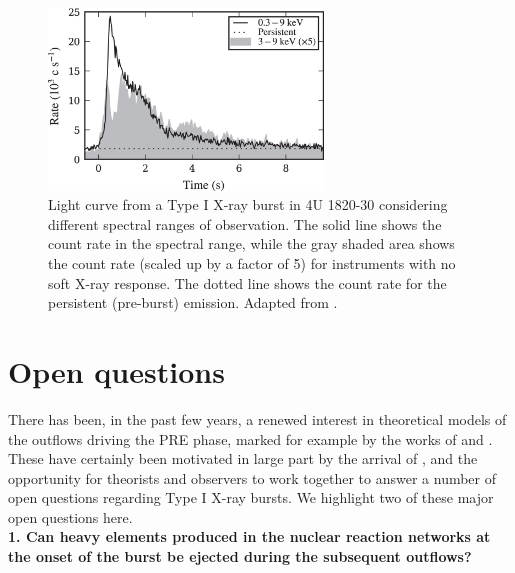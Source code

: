\documentclass[../main.tex]{subfiles}
\begin{document}
\begin{figure}[htb!]
    \centering
    \includegraphics[width=0.65\textwidth]{figures/Keek2018_fig1_mod.jpg}
    \caption[\Nicer~ PRE burst light curve]{Light curve from a Type I X-ray burst in 4U 1820-30 considering different spectral ranges of observation. The solid line shows the count rate in the {\Nicer} spectral range, while the gray shaded area shows the count rate (scaled up by a factor of 5) for instruments with no soft X-ray response. The dotted line shows the count rate for the persistent (pre-burst) emission. Adapted from \citet{Keek2018a}.}
    \label{fig:keek2018_fig1}
\end{figure}

\section{Open questions}\label{sec:open_questions}
There has been, in the past few years, a renewed interest in theoretical models of the outflows driving the PRE phase, marked for example by the works of \citet{YuHangWeinberg2018} and \citet{Herrera2020}. These have certainly been motivated in large part by the arrival of \Nicer, and the opportunity for theorists and observers to work together to answer a number of open questions regarding Type I X-ray bursts. We highlight two of these major open questions here. \\

\noindent\textbf{1. Can heavy elements produced in the nuclear reaction networks at the onset of the burst be ejected during the subsequent outflows?} 

\end{document}
